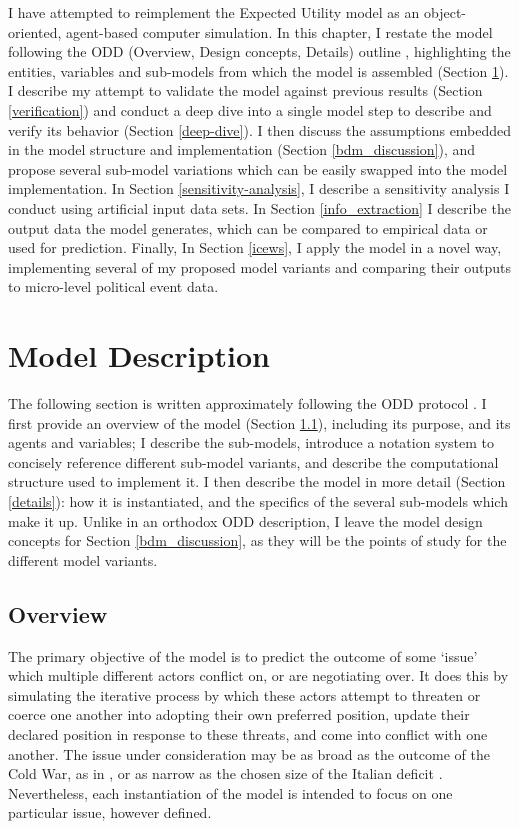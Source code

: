 I have attempted to reimplement the Expected Utility model as an object-oriented, agent-based computer simulation. In this chapter, I restate the model following the ODD (Overview, Design concepts, Details) outline \citep{grimm_2006}, highlighting the entities, variables and sub-models from which the model is assembled (Section \ref{model_description}). I describe my attempt to validate the model against previous results (Section \ref{verification}) and conduct a deep dive into a single model step to describe and verify its behavior (Section \ref{deep-dive}). I then discuss the assumptions embedded in the model structure and implementation (Section \ref{bdm_discussion}), and propose several sub-model variations which can be easily swapped into the model implementation. In Section \ref{sensitivity-analysis}, I describe a sensitivity analysis I conduct using artificial input data sets. In Section \ref{info_extraction} I describe the output data the model generates, which can be compared to empirical data or used for prediction. Finally, In Section \ref{icews}, I apply the model in a novel way, implementing several of my proposed model variants and comparing their outputs to micro-level political event data.

\section{Model Description} \label{model_description}

The following section is written approximately following the ODD protocol \citep{grimm_2006}. I first provide an overview of the model (Section \ref{overview}), including its purpose, and its agents and variables; I describe the sub-models, introduce a notation system to concisely reference different sub-model variants, and describe the computational structure used to implement it. I then describe the model in more detail (Section \ref{details}): how it is instantiated, and the specifics of the several sub-models which make it up. Unlike in an orthodox ODD description, I leave the model design concepts for Section \ref{bdm_discussion}, as they will be the points of study for the different model variants.

\subsection{Overview} \label{overview}


The primary objective of the model is to predict the outcome of some `issue' which multiple different actors conflict on, or are negotiating over. It does this by simulating the iterative process by which these actors attempt to threaten or coerce one another into adopting their own preferred position, update their declared position in response to these threats, and come into conflict with one another. The issue under consideration may be as broad as the outcome of the Cold War, as in \citet{bdm_1998}, or as narrow as the chosen size of the Italian deficit \citep{feder_1992}. Nevertheless, each instantiation of the model is intended to focus on one particular issue, however defined.

